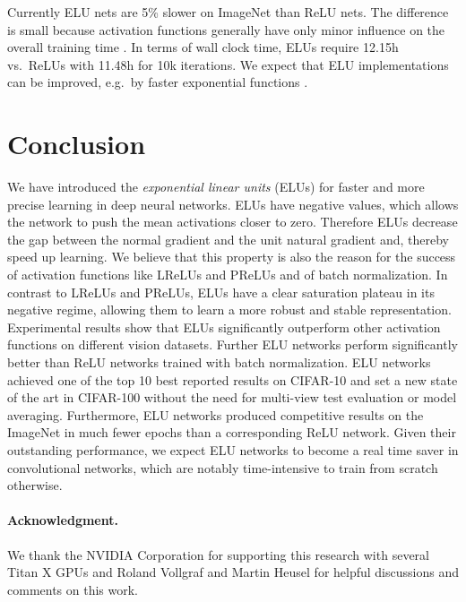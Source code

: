 \documentclass{article}
\begin{document}
Currently ELU nets are 5\% slower on ImageNet than ReLU nets.
The difference is small because
activation functions generally have only minor influence on the overall
training time \citep{Jia:14}.
In terms of wall clock time, ELUs require 12.15h vs.\ ReLUs with
11.48h for 10k iterations.
We expect that ELU implementations can be improved, e.g.\ by faster
exponential functions \citep{Schraudolph:99}.


\section{Conclusion}
\label{sec:concl}
We have introduced the {\em exponential linear units} (ELUs) for faster and
more precise learning in deep neural networks.
ELUs have negative values, which allows the network to push
the mean activations closer to zero. Therefore ELUs decrease the gap
between the normal gradient and the unit natural gradient and, thereby
speed up learning.
We believe that this property is also the reason for the success
of activation functions like LReLUs and PReLUs and of batch
normalization. In contrast to LReLUs and PReLUs,
ELUs have a clear saturation plateau in its negative regime, allowing them
to learn a more robust and stable representation.
Experimental results show
that ELUs significantly outperform other activation functions
on different vision datasets. Further ELU networks perform
significantly better than ReLU networks trained with batch normalization.
ELU networks achieved one of the top 10 best reported results on CIFAR-10 and
set a new state of the art in
CIFAR-100 without the need for multi-view test evaluation or model averaging.
Furthermore, ELU networks produced competitive results on the ImageNet in much
fewer epochs than a corresponding ReLU network.
Given their outstanding performance, we expect
ELU networks to become a real time saver in convolutional networks, which are
notably time-intensive to train from scratch otherwise.

\paragraph*{Acknowledgment.} We thank the NVIDIA Corporation for supporting this research
with several Titan X GPUs and Roland Vollgraf and Martin Heusel for helpful discussions and
comments on this work.

\small{
\setlength{\bibsep}{1.5pt}

%
%

}
\end{document}
